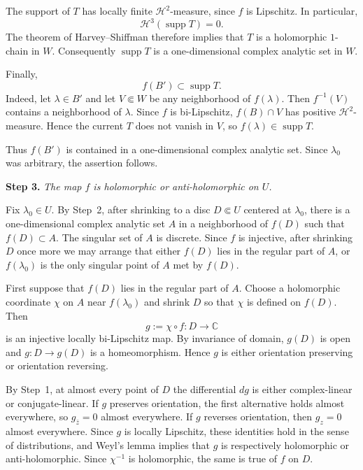 \documentclass[12pt]{amsart}
\newcommand{\CC}{\mathbb C}
\newcommand{\supp}{\operatorname{supp}}
\begin{document}
The support of $T$ has locally finite $\mathcal H^2$-measure, since
$f$ is Lipschitz. In particular,
\[
 \mathcal H^3(\supp T)=0.
\]
The theorem of Harvey--Shiffman
\cite[Theorem~2.1]{HarveyShiffman1974} therefore implies that $T$ is
a holomorphic $1$-chain in $W$. Consequently $\supp T$ is a
one-dimensional complex analytic set in $W$.

Finally,
\[
 f(B')\subset\supp T.
\]
Indeed, let $\lambda\in B'$ and let $V\Subset W$ be any neighborhood
of $f(\lambda)$. Then $f^{-1}(V)$ contains a neighborhood of $\lambda$.
Since $f$ is bi-Lipschitz, $f(B)\cap V$ has positive
$\mathcal H^2$-measure. Hence the current $T$ does not vanish in $V$,
so $f(\lambda)\in\supp T$.

Thus $f(B')$ is contained in a one-dimensional complex analytic set.
Since $\lambda_0$ was arbitrary, the assertion follows.

\medskip

\noindent
\textbf{Step 3.}
\emph{The map $f$ is holomorphic or anti-holomorphic on $U$.}

\medskip

Fix $\lambda_0\in U$. By Step~2, after shrinking to a disc
$D\Subset U$ centered at $\lambda_0$, there is a one-dimensional complex
analytic set $A$ in a neighborhood of $f(D)$ such that $f(D)\subset A$.
The singular set of $A$ is discrete. Since $f$ is injective, after shrinking
$D$ once more we may arrange that either $f(D)$ lies in the regular part of
$A$, or $f(\lambda_0)$ is the only singular point of $A$ met by $f(D)$.

First suppose that $f(D)$ lies in the regular part of $A$. Choose a
holomorphic coordinate $\chi$ on $A$ near $f(\lambda_0)$ and shrink $D$ so that
$\chi$ is defined on $f(D)$. Then
\[
 g:=\chi\circ f:D\longrightarrow\CC
\]
is an injective locally bi-Lipschitz map. By invariance of domain, $g(D)$ is
open and $g:D\to g(D)$ is a homeomorphism. Hence $g$ is either orientation
preserving or orientation reversing.

By Step~1, at almost every point of $D$ the differential $dg$ is either
complex-linear or conjugate-linear. If $g$ preserves orientation, the first
alternative holds almost everywhere, so $g_{\bar z}=0$ almost everywhere. If
$g$ reverses orientation, then $g_z=0$ almost everywhere. Since $g$ is locally
Lipschitz, these identities hold in the sense of distributions, and Weyl's
lemma implies that $g$ is respectively holomorphic or anti-holomorphic. Since
$\chi^{-1}$ is holomorphic, the same is true of $f$ on $D$.
\end{document}
